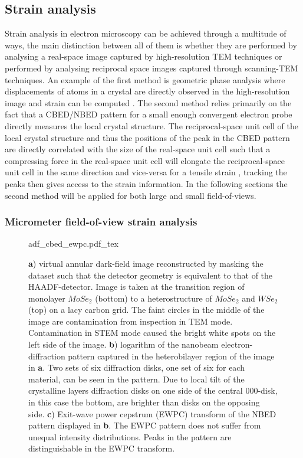 \subsection{Strain analysis}
Strain analysis in electron microscopy can be achieved through a multitude of ways, the main distinction between all of them is whether they are performed by analysing a real-space image captured by high-resolution TEM techniques or performed by analysing reciprocal space images captured through scanning-TEM techniques. An example of the first method is geometric phase analysis where displacements of atoms in a crystal are directly observed in the high-resolution image and strain can be computed \cite{HYTCH1998131, hytchGEOMETRICPHASEANALYSIS, nguyenAtomicDefectsDoping2017}. The second method relies primarily on the fact that a CBED/NBED pattern for a small enough convergent electron probe directly measures the local crystal structure. The reciprocal-space unit cell of the local crystal structure and thus the positions of the peak in the CBED pattern are directly correlated with the size of the real-space unit cell such that a compressing force in the real-space unit cell will elongate the reciprocal-space unit cell in the same direction and vice-versa for a tensile strain \cite{ophusFourDimensionalScanningTransmission2019, vanwinkleRotationalDilationalReconstruction2023, kazmierczakStrainFieldsTwisted2021, hanStrainMappingTwoDimensional2018}, tracking the peaks then gives access to the strain information.  In the following sections the second method will be applied for both large and small field-of-views.

\subsubsection{Micrometer field-of-view strain analysis}
\begin{figure}[h]
	\centering
	\def\svgwidth{0.9\linewidth}
	{adf_cbed_ewpc.pdf_tex}
    \caption{\textbf{a}) virtual annular dark-field image reconstructed by masking the dataset such that the detector geometry is equivalent to that of the HAADF-detector. Image is taken at the transition region of monolayer $MoSe_2$ (bottom) to a heterostructure of $MoSe_2$ and $WSe_2$ (top) on a lacy carbon grid. The faint circles in the middle of the image are contamination from inspection in TEM mode. Contamination in STEM mode caused the bright white spots on the left side of the image. \textbf{b}) logarithm of the nanobeam electron-diffraction pattern captured in the heterobilayer region of the image in \textbf{a}. Two sets of six diffraction disks, one set of six for each material, can be seen in the pattern. Due to local tilt of the crystalline layers diffraction disks on one side of the central $000$-disk, in this case the bottom, are brighter than disks on the opposing side. \textbf{c}) Exit-wave power cepstrum (EWPC) transform of the NBED pattern displayed in \textbf{b}. The EWPC pattern does not suffer from unequal intensity distributions. Peaks in the pattern are distinguishable in the EWPC transform.}
	\label{fig:adf_nbed_ewpc}
\end{figure}



